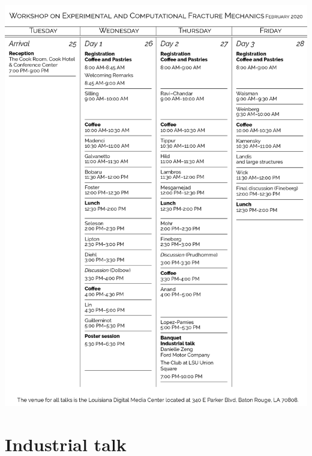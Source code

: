 \documentclass[12pt,letterpaper]{book}
\begin{document}
\includegraphics[width=\linewidth]{timetable_edit.png}


\tableofcontents

\mainmatter

\chapter{Industrial talk}
\end{document}
